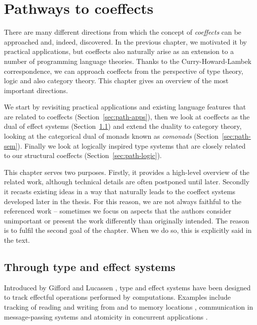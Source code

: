 \chapter{Pathways to coeffects} 
\label{ch:pathways} 


There are many different directions from which the concept of \emph{coeffects} can be approached 
and, indeed, discovered. In the previous chapter, we motivated it by practical applications, but 
coeffects also naturally arise as an extension to a number of programming language theories.
Thanks to the Curry-Howard-Lambek correspondence, we can approach coeffects from the perspective of 
type theory, logic and also category theory. This chapter gives an overview of the most 
important directions.

We start by revisiting practical applications and existing language features that are related to 
coeffects (Section~\ref{sec:path-apps}), then we look at coeffects as the dual of effect systems
(Section~\ref{sec:path-eff}) and extend the duality to category theory, looking at the categorical 
dual of monads known as \emph{comonads} (Section~\ref{sec:path-sem}). Finally we look at logically 
inspired type systems that are closely related to our structural coeffects 
(Section~\ref{sec:path-logic}).

This chapter serves two purposes. Firstly, it provides a high-level overview of the  related work, 
although technical details are often postponed until later. Secondly it recasts existing ideas in 
a way that naturally leads to the coeffect systems developed later in the thesis. For this reason, 
we are not always faithful to the referenced work -- sometimes we focus on aspects that the 
authors consider unimportant or present the work differently than originally intended. The reason 
is to fulfil the second goal of the chapter. When we do so, this is explicitly said in the text.


\section{Through type and effect systems}
\label{sec:path-eff}

Introduced by Gifford and Lucassen \cite{effects-gifford,effects-polymorphic}, type and effect 
systems have been designed to track effectful operations performed by computations. Examples 
include tracking of reading and writing from and to memory locations \cite{effects-talpin-et-al}, 
communication in message-passing systems \cite{effects-messagepassing} and atomicity in concurrent 
applications \cite{effects-atomicity}.

